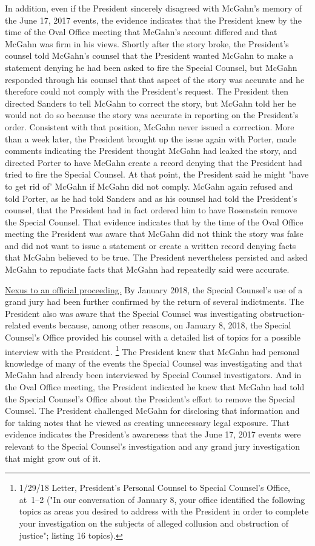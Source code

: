 {In addition, even if the President sincerely disagreed with McGahn's memory of the June 17, 2017 events, the evidence indicates that the President knew by the time of the Oval Office
meeting that McGahn's account differed and that McGahn was firm in his views.
Shortly after the story broke, the President's counsel told McGahn's counsel that the President wanted McGahn to make a statement denying he had been asked to fire the Special Counsel, but McGahn responded through his counsel that that aspect of the story was accurate and he therefore could not comply with the President's request.
The President then directed Sanders to tell McGahn to correct the story, but McGahn told her he would not do so because the story was accurate in reporting on the President's order.
Consistent with that position, McGahn never issued a correction.
More than a week later, the President brought up the issue again with Porter, made comments indicating the President thought McGahn had leaked the story, and directed Porter to have McGahn create a record denying that the President had tried to fire the Special Counsel.
At that point, the President said he might "have to get rid of' McGahn if McGahn did not comply.
McGahn again refused and told Porter, as he had told Sanders and as his counsel had told the President's counsel, that the President had in fact ordered him to have Rosenstein remove the Special Counsel.
That evidence indicates that by the time of the Oval Office meeting the President was aware that McGahn did not think the story was false and did not want to issue a statement or create a written record denying facts that McGahn believed to be true.
The President nevertheless persisted and asked McGahn to repudiate facts that McGahn had repeatedly said were accurate.

\underline{Nexus to an official proceeding.}
By January 2018, the Special Counsel's use of a grand jury had been further confirmed by the return of several indictments.
The President also was aware that the Special Counsel was investigating obstruction-related events because, among other reasons, on January 8, 2018, the Special Counsel's Office provided his counsel with a detailed list of topics for a possible interview with the President.%
\footnote{1/29/18 Letter, President's Personal Counsel to Special Counsel's Office, at~1--2 ("In our conversation of January 8, your office identified the following topics as areas you desired to address with the President in order to complete your investigation on the subjects of alleged collusion and obstruction of justice";
listing 16 topics).}
The President knew that McGahn had personal knowledge of many of the events the Special Counsel was investigating and that McGahn had already been interviewed by Special Counsel investigators.
And in the Oval Office meeting, the President indicated he knew that McGahn had told the Special Counsel's Office about the President's effort to remove the Special Counsel.
The President challenged McGahn for disclosing that information and for taking notes that he viewed as creating unnecessary legal exposure.
That evidence indicates the President's awareness that the June 17, 2017 events were relevant to the Special Counsel's investigation and any grand jury investigation that might grow out of it.

}
